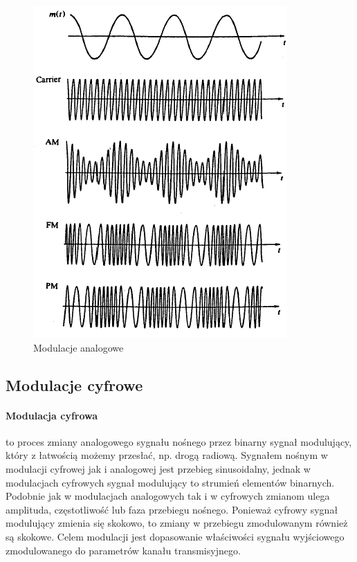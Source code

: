 \documentclass[a4paper,twoside]{report}
\begin{document}
\begin{figure}[htbp]
\centering
\includegraphics[scale=0.8]{obrazy/modulacje.png}
\caption{Modulacje analogowe}
\label{rys:modulacje}
\end{figure}

 
\subsection{Modulacje cyfrowe}
\paragraph{Modulacja cyfrowa} to proces zmiany analogowego sygnału nośnego przez binarny sygnał modulujący, który z łatwością możemy przesłać, np. drogą radiową. Sygnałem nośnym w modulacji cyfrowej jak i analogowej jest przebieg sinusoidalny, jednak w modulacjach cyfrowych sygnał modulujący to strumień elementów binarnych. Podobnie jak w modulacjach analogowych tak i w cyfrowych zmianom ulega amplituda, częstotliwość lub faza przebiegu nośnego. Ponieważ cyfrowy sygnał modulujący zmienia się skokowo, to zmiany w przebiegu zmodulowanym również są skokowe. Celem modulacji jest dopasowanie właściwości sygnału wyjściowego zmodulowanego do parametrów kanału transmisyjnego.
\end{document}
